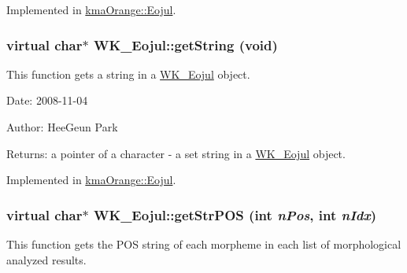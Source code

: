 Implemented in \hyperlink{classkmaOrange_1_1Eojul_4fe935c9f57b939f523ea2431af635c4}{kmaOrange::Eojul}.\hypertarget{classWK__Eojul_ac9caae5a102114862eb398994596fbf}{
\subsubsection[{getString}]{\setlength{\rightskip}{0pt plus 5cm}virtual char$\ast$ WK\_\-Eojul::getString (void)}}
\label{classWK__Eojul_ac9caae5a102114862eb398994596fbf}


This function gets a string in a \hyperlink{classWK__Eojul}{WK\_\-Eojul} object. 

\begin{Desc}
\item[Date:]2008-11-04 \end{Desc}
\begin{Desc}
\item[Author:]HeeGeun Park \end{Desc}
\begin{Desc}
\item[Returns:]a pointer of a character - a set string in a \hyperlink{classWK__Eojul}{WK\_\-Eojul} object. \end{Desc}


Implemented in \hyperlink{classkmaOrange_1_1Eojul_3d9a40689d2eb031b43cc98e08ce25da}{kmaOrange::Eojul}.\hypertarget{classWK__Eojul_87720be1679d0d1c86c193e4c3953d00}{
\subsubsection[{getStrPOS}]{\setlength{\rightskip}{0pt plus 5cm}virtual char$\ast$ WK\_\-Eojul::getStrPOS (int {\em nPos}, \/  int {\em nIdx})}}
\label{classWK__Eojul_87720be1679d0d1c86c193e4c3953d00}


This function gets the POS string of each morpheme in each list of morphological analyzed results. 

